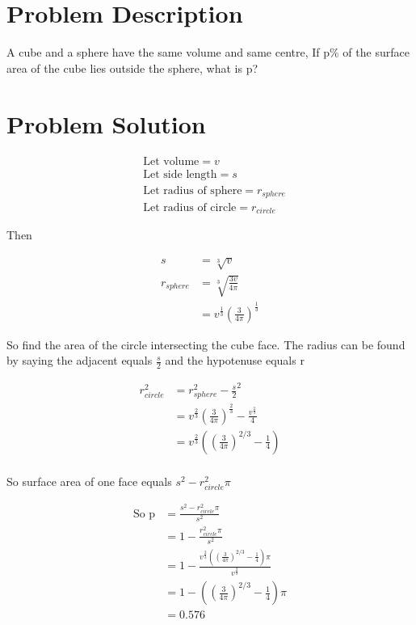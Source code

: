 \documentclass{article}
\begin{document}
\section{Problem Description}
\huge
A cube and a sphere have the same volume and same centre,
If p\% of the surface area of the cube lies outside the sphere,
what is p?

\section{Problem Solution}
\begin{align*}
    &\text{Let volume} = v\\
    &\text{Let side length} = s\\
    &\text{Let radius of sphere} = r_{sphere}\\
    &\text{Let radius of circle} = r_{circle}
\end{align*}

Then 

\begin{align*}
    s &= \sqrt[3]{v}\\
    r_{sphere} &= \sqrt[3]{\frac{3v}{4\pi}}\\
               &= v^\frac{1}{3} \left(\frac{3}{4\pi}\right)^\frac{1}{3}
\end{align*}

So find the area of the circle intersecting the cube face.
The radius can be found by saying the adjacent equals
$\frac{s}{2}$ and the hypotenuse equals r

\begin{align*}
    r_{circle}^2 &= r_{sphere}^2 - \frac{s}{2}^2\\
    &= v^\frac{2}{3} \left(\frac{3}{4\pi}\right)^\frac{2}{3}
    - \frac{v^\frac{2}{3}}{4}\\
    &= v^\frac{2}{3}\left(
        \left(\frac{3}{4\pi}\right)^{2/3}
        - \frac{1}{4}\right)\\
\end{align*}

So surface area of one face equals $s^2 - r_{circle}^2\pi$

\begin{align*}
    \text{So p} &= \frac{s^2 - r_{circle}^2\pi}{s^2}\\
            &= 1 - \frac{r_{circle}^2\pi}{s^2}\\
            &= 1 - \frac{v^\frac{2}{3}\left(
                \left(\frac{3}{4\pi}\right)^{2/3}
                - \frac{1}{4}\right)\pi}
                {v^{\frac{2}{3}}}\\
            &= 1 - \left(\left(\frac{3}{4\pi}\right)^{2/3}
                    - \frac{1}{4}\right)\pi\\
            &= 0.576
\end{align*}
\end{document}
